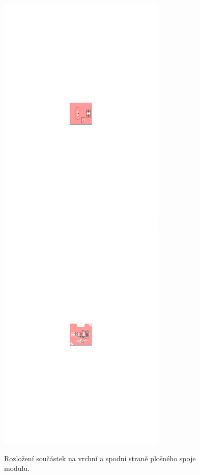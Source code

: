 \documentclass[12pt,a4paper,oneside]{article}
\begin{document}
\begin{figure} [htbp]
  \includegraphics[trim = 85mm 132mm 85mm 132mm, clip, width=8cm]{../../CAM_DOC/O1.pdf}
  \includegraphics[trim = 85mm 132mm 85mm 132mm, clip, width=8cm]{../../CAM_DOC/O2.pdf}
  \caption{Rozložení součástek na vrchní a spodní straně plošného spoje modulu.}
\end{figure}
\end{document}
